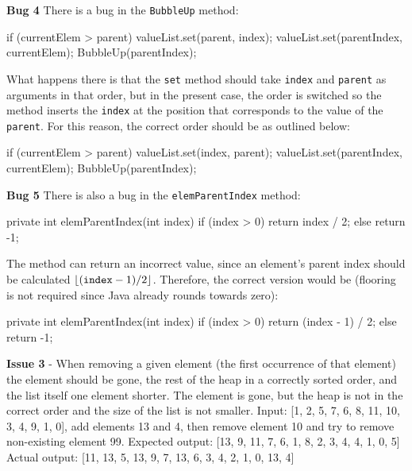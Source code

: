 \documentclass[11pt]{article}
\begin{document}
\hfill\begin{minipage}{\dimexpr\textwidth-0.5cm}
\textbf{Bug 4}
\newline
There is a bug in the \verb/BubbleUp/ method:
\begin{javacode}
    if (currentElem > parent) {
        valueList.set(parent, index);
        valueList.set(parentIndex, currentElem);
        BubbleUp(parentIndex);
        }
\end{javacode}
What happens there is that the \verb/set/ method should take \verb/index/ and \verb/parent/ as arguments in that order, but in the present case, the order is switched so the method inserts the \verb/index/ at the position that corresponds to the value of the \verb/parent/. For this reason, the correct order should be as outlined below:
\begin{javacode}
    if (currentElem > parent) {
        valueList.set(index, parent);
        valueList.set(parentIndex, currentElem);
        BubbleUp(parentIndex);
    }
\end{javacode}
\end{minipage}

\hfill\begin{minipage}{\dimexpr\textwidth-0.5cm}
\textbf{Bug 5}
\newline
There is also a bug in the \verb/elemParentIndex/ method:
\begin{javacode}
    private int elemParentIndex(int index) {
        if (index > 0) {
            return index / 2;
        } else return -1;
    }
\end{javacode}
The method can return an incorrect value, since an element's parent index should be calculated $\lfloor (\verb/index/ - 1) / 2 \rfloor$. Therefore, the correct version would be (flooring is not required since Java already rounds towards zero):
\begin{javacode}
    private int elemParentIndex(int index) {
        if (index > 0) {
            return (index - 1) / 2;
        } else return -1;
    }
\end{javacode}
\end{minipage}

\textbf{Issue 3} - When removing a given element (the first occurrence of that element) the element should be gone, the rest of the heap in a correctly sorted order, and the list itself one element shorter. The element is gone, but the heap is not in the correct order and the size of the list is not smaller.
\newline
Input: [1, 2, 5, 7, 6, 8, 11, 10, 3, 4, 9, 1, 0], add elements 13 and 4, then remove element 10 and try to remove non-existing element 99.
\newline
Expected output: [13, 9, 11, 7, 6, 1, 8, 2, 3, 4, 4, 1, 0, 5]
\newline
Actual output: [11, 13, 5, 13, 9, 7, 13, 6, 3, 4, 2, 1, 0, 13, 4]
\end{document}
